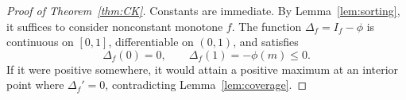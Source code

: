 \begin{proof}[Proof of Theorem~\ref{thm:CK}]
Constants are immediate. By Lemma~\ref{lem:sorting}, it suffices
to consider nonconstant monotone \(f\).
The function \(\Delta_f=I_f-\phi\) is continuous on \([0,1]\),
differentiable on \((0,1)\), and satisfies
\[
 \Delta_f(0)=0,\qquad \Delta_f(1)=-\phi(m)\le0.
\]
If it were positive somewhere, it would attain a positive
maximum at an interior point where \(\Delta_f'=0\),
contradicting Lemma~\ref{lem:coverage}.
\end{proof}
